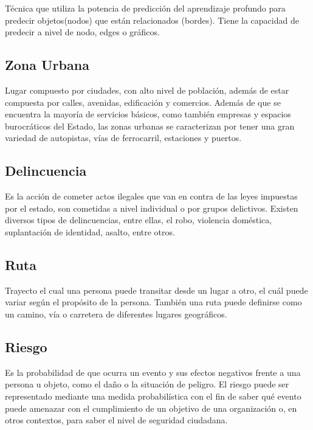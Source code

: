 Técnica que utiliza la potencia de predicción del aprendizaje profundo para predecir objetos(nodos) que están relacionados (bordes). Tiene la capacidad de predecir a nivel de nodo, edges o gráficos\parencite{gl_Nvidia}. 

\subsection{Zona Urbana}

Lugar compuesto por ciudades, con alto nivel de población, además de estar compuesta por calles, avenidas, edificación y comercios. Además de que se encuentra la mayoría de servicios básicos, como también empresas y espacios burocráticos del Estado, las zonas urbanas se caracterizan por tener una gran variedad de autopistas, vías de ferrocarril, estaciones y puertos\parencite{gl_humanidades}.

\subsection{Delincuencia}

Es la acción de cometer actos ilegales que van en contra de las leyes impuestas por el estado, son cometidas a nivel individual o por grupos delictivos. Existen diversos tipos de delincuencias, entre ellas, el robo, violencia doméstica, suplantación de identidad, asalto, entre otros\parencite{gl_concepto}.


\subsection{Ruta}

Trayecto el cual una persona puede transitar desde un lugar a otro, el cuál puede variar según el propósito de la persona. También una ruta puede definirse como un camino, vía o carretera de diferentes lugares geográficos\parencite{gl_ruta}.

\subsection{Riesgo}

Es la probabilidad de que ocurra un evento y sus efectos negativos frente a una persona u objeto, como el daño o la situación de peligro. El riesgo puede ser representado mediante una medida probabilística con el fin de saber qué evento puede amenazar con el cumplimiento de un objetivo de una organización o, en otros contextos, para saber el nivel de seguridad ciudadana\parencite{gl_riesgo}.